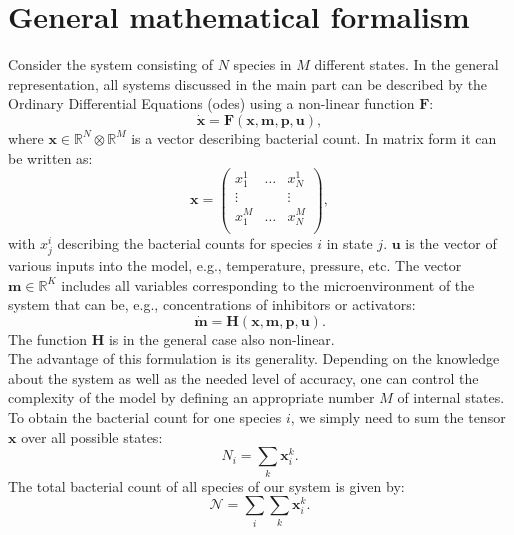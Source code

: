 \documentclass[10pt,1p,authoryear]{elsarticle}
\numberwithin{equation}{section}
\newcommand{\mbx}{\mathbf{x}}
\newcommand{\mbm}{\mathbf{m}}
\newcommand{\mbp}{\mathbf{p}}
\newcommand{\mbu}{\mathbf{u}}
\newcommand{\mbF}{\mathbf{F}}
\newcommand{\mbH}{\mathbf{H}}
\begin{document}
\section{General mathematical formalism}
\label{ssec:supplement1}
Consider the system consisting of $N$ species in $M$ different states.
In the general representation, all systems discussed in the main part can be described by the Ordinary Differential Equations (\acp{ode}) using a non-linear function $\mbF$:
\begin{equation}
   \dot{\mbx} = \mbF(\mbx, \mbm, \mbp, \mbu),
\label{eq:model_ODE_x}
\end{equation}
where  $\mbx \in \mathbb{R}^{N}  \otimes \mathbb{R}^{M}$ is a vector describing bacterial count.
In matrix form it can be written as:
\begin{equation}
    \mbx = \begin{pmatrix}
        x^1_1  & \dots & x^1_N  \\
        \vdots &       & \vdots \\
        x^M_1  & \dots & x^M_N  \\
            \end{pmatrix},
    \label{eq:model_bact}
\end{equation}
with $x_{j}^{i}$ describing the bacterial counts for species $i$ in state $j$.
$\mbu$ is the vector of various inputs into the model, e.g., temperature, pressure, etc.
The vector $\mbm \in \mathbb{R}^{K}$ includes all variables corresponding to the microenvironment of the system that can be, e.g., concentrations of inhibitors or activators:
\begin{equation}
    \dot{\mbm} = \mbH (\mbx, \mbm, \mbp, \mbu).
    \label{eq:model_microenv}
\end{equation}
The function $\mbH$ is in the general case also non-linear.\\
%
The advantage of this formulation is its generality. Depending on the knowledge about the system as well as the needed level of accuracy, one can control the complexity of the model by defining an appropriate number $M$ of internal states.\\
%
To obtain the bacterial count for one species $i$, we simply need to sum the tensor $\mbx$ over all possible states:
\begin{equation}
    N_i = \sum_k \mbx_i^k.
\label{eq:N_pro_species}
\end{equation}
The total bacterial count of all species of our system is given by:
\begin{equation}
    \mathcal{N} = \sum_i \sum_k \mbx_i^k.
\label{eq:N_total}
\end{equation}
\end{document}
